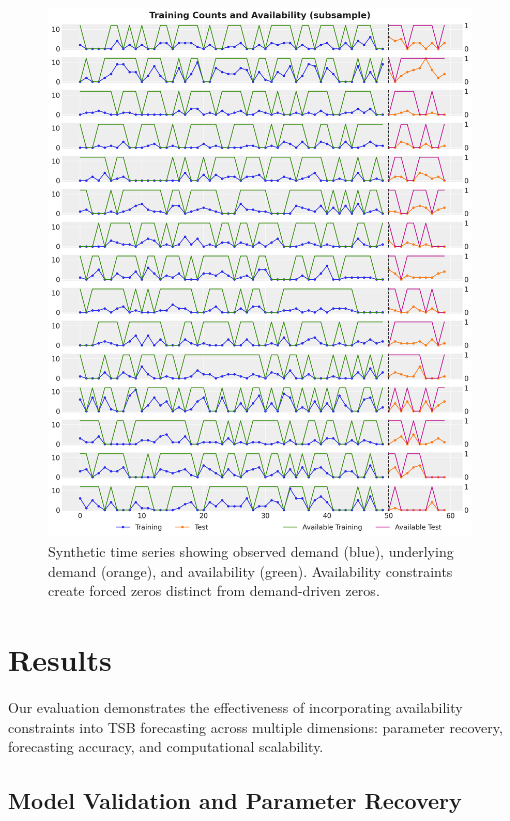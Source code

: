 \documentclass[11pt]{amsart}
\theoremstyle{definition}
\begin{document}
\begin{figure}
    \centering
    \includegraphics[width=\textwidth]{images/availability_tsb_12_0.png}
    \caption{Synthetic time series showing observed demand (blue), underlying demand (orange), and availability (green). 
        Availability constraints create forced zeros distinct from demand-driven zeros.}
    \label{fig:synthetic_data}
\end{figure}

\section{Results}

Our evaluation demonstrates the effectiveness of incorporating availability constraints into TSB forecasting across 
multiple dimensions: parameter recovery, forecasting accuracy, and computational scalability.

\subsection{Model Validation and Parameter Recovery}
\end{document}

